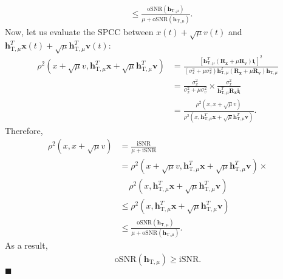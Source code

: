 \documentclass[10pt,pdflatex,headrule,landscape]{beamer}
\begin{document}
\begin{frame}[allowframebreaks]
\begin{align*}
 & \leq  \frac{ \mathrm{oSNR} \left( \mathbf{h}_{\mathrm{T},\mu} \right) } { \mu + \mathrm{oSNR} \left( \mathbf{h}_{\mathrm{T},\mu} \right) }.
\end{align*}
Now, let us evaluate the SPCC between $x(t)+ \sqrt{\mu} v(t)$ and $\mathbf{h}_{\mathrm{T},\mu}^T \mathbf{x}(t) + \sqrt{\mu}
\mathbf{h}_{\mathrm{T},\mu}^T \mathbf{v}(t)$:
\begin{align*}
 \rho^2 \left( x+ \sqrt{\mu} v, \mathbf{h}_{\mathrm{T},\mu}^T \mathbf{x} + \sqrt{\mu} \mathbf{h}_{\mathrm{T},\mu}^T \mathbf{v} \right)
 &= \frac{ \left[ \mathbf{h}_{\mathrm{T},\mu}^T \left( \mathbf{R}_{\mathbf{x}} + \mu \mathbf{R}_{\mathbf{v}} \right) \mathbf{i}_{\mathrm{i}} \right]^2 } { \left( \sigma_x^2 + \mu \sigma_v^2 \right)
 \mathbf{h}_{\mathrm{T},\mu}^T \left( \mathbf{R}_{\mathbf{x}} + \mu \mathbf{R}_{\mathbf{v}} \right) \mathbf{h}_{\mathrm{T},\mu} } \\
 &= \frac{ \sigma_x^2 } { \sigma_x^2 + \mu \sigma_v^2 } \times
 \frac{ \sigma_x^2 } { \mathbf{h}_{\mathrm{T},\mu}^T \mathbf{R}_{\mathbf{x}} \mathbf{i}_{\mathrm{i}} } \\
 &= \frac{ \rho^2 \left( x, x + \sqrt{\mu} v \right) } { \rho^2 \left( x, \mathbf{h}_{\mathrm{T},\mu}^T \mathbf{x}
 + \sqrt{\mu} \mathbf{h}_{\mathrm{T},\mu}^T \mathbf{v} \right) }.
\end{align*}
Therefore,
\begin{align*}
 \rho^2 \left( x, x + \sqrt{\mu} v \right) &= \frac{ \mathrm{iSNR} } { \mu + \mathrm{iSNR} } \\
 &= \rho^2 \left( x + \sqrt{\mu} v, \mathbf{h}_{\mathrm{T},\mu}^T\mathbf{x} + \sqrt{\mu} \mathbf{h}_{\mathrm{T},\mu}^T\mathbf{v} \right) \times \nonumber \\
 &~~~~~ \rho^2 \left( x, \mathbf{h}_{\mathrm{T},\mu}^T\mathbf{x} + \sqrt{\mu} \mathbf{h}_{\mathrm{T},\mu}^T\mathbf{v} \right) \\
 & \leq  \rho^2 \left( x, \mathbf{h}_{\mathrm{T},\mu}^T\mathbf{x} + \sqrt{\mu} \mathbf{h}_{\mathrm{T},\mu}^T\mathbf{v} \right) \\
 & \leq  \frac{ \mathrm{oSNR} \left( \mathbf{h}_{\mathrm{T},\mu} \right) } { \mu + \mathrm{oSNR} \left( \mathbf{h}_{\mathrm{T},\mu} \right) }.
\end{align*}
As a result,
\begin{eqnarray*}
 \mathrm{oSNR} \left( \mathbf{h}_{\mathrm{T},\mu} \right) \geq \mathrm{iSNR}.
\end{eqnarray*}
\hspace{4.3in} $\blacksquare$

\end{frame}
\end{document}
